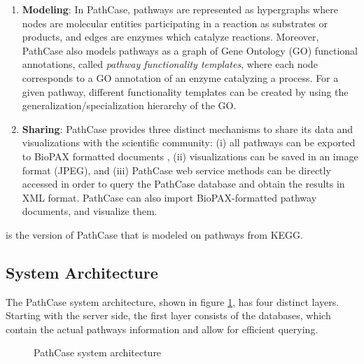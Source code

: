 \begin{enumerate}
    \item \textbf{Modeling}: In PathCase, pathways are represented as
    hypergraphs \cite{Berge-1973} where nodes are molecular entities
    participating in a reaction as substrates or products, and edges are enzymes
    which catalyze reactions. Moreover, PathCase also models pathways as a graph
    of Gene Ontology (GO) functional annotations, called \emph{pathway
    functionality templates}, where each node corresponds to a GO annotation of
    an enzyme catalyzing a process. For a given pathway, different functionality
    templates can be created by using the generalization/specialization
    hierarchy of the GO.

    \item \textbf{Sharing}: PathCase provides three distinct mechanisms to share
    its data and visualizations with the scientific community: (i) all pathways
    can be exported to BioPAX formatted documents \cite{BioPAX}, (ii)
    visualizations can be saved in an image format (JPEG), and (iii) PathCase
    web service methods can be directly accessed in order to query the PathCase
    database and obtain the results in XML format. PathCase can also import
    BioPAX-formatted pathway documents, and visualize them.

\end{enumerate}

\textbf{\pathcasekegg} is the version of PathCase that is modeled on pathways
from KEGG.

\subsection{System Architecture}
\label{sect:pathcase_architecture}

The PathCase system architecture, shown in figure
\ref{fig:pathcase_architecture}, has four distinct layers. Starting with the
server side, the first layer consists of the databases, which contain the actual
pathways information and allow for efficient querying.

\begin{figure}[hbt]
    \caption{\label{fig:pathcase_architecture} PathCase system architecture}
\end{figure}


